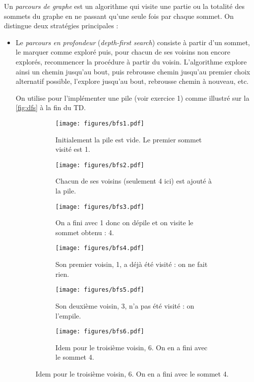 \documentclass{article}
\begin{document}
Un \emph{parcours de graphe} est un algorithme qui visite une partie ou la totalité des sommets du graphe en ne passant qu'une seule fois par chaque sommet. On distingue deux stratégies principales :
\begin{itemize}
	\item Le \emph{parcours en profondeur} (\textit{depth-first search}) consiste à partir d'un sommet, le marquer comme exploré puis, pour chacun de ses voisins non encore explorés, recommencer la procédure à partir du voisin. L'algorithme explore ainsi un chemin jusqu'au bout, puis rebrousse chemin jusqu'au premier choix alternatif possible, l'explore jusqu'au bout, rebrousse chemin à nouveau, etc.
	
	On utilise pour l'implémenter une pile (voir exercice 1) comme illustré sur la \autoref{fig:dfs} à la fin du TD.
	
	\begin{figure}[b]
		\caption{Illustration d'un parcours en profondeur commençant par le sommet 1}\label{fig:dfs}
		\begin{subfigure}[t]{0.3\linewidth}
			\centering
			\texttt{[image: figures/bfs1.pdf]}
			\caption{Initialement la pile est vide. Le premier sommet visité est 1.}
		\end{subfigure}\hfill%
		\begin{subfigure}[t]{0.3\linewidth}
			\centering
			\texttt{[image: figures/bfs2.pdf]}
			\caption{Chacun de ses voisins (seulement 4 ici) est ajouté à la pile.}
		\end{subfigure}\hfill%
		\begin{subfigure}[t]{0.3\linewidth}
			\centering
			\texttt{[image: figures/bfs3.pdf]}
			\caption{On a fini avec 1 donc on dépile et on visite le sommet obtenu : 4.}
		\end{subfigure}
		
		\begin{subfigure}[t]{0.3\linewidth}
			\centering
			\texttt{[image: figures/bfs4.pdf]}
			\caption{Son premier voisin, 1, a déjà été visité : on ne fait rien.}
		\end{subfigure}\hfill%
		\begin{subfigure}[t]{0.3\linewidth}
			\centering
			\texttt{[image: figures/bfs5.pdf]}
			\caption{Son deuxième voisin, 3, n'a pas été visité : on l'empile.}
		\end{subfigure}\hfill%
		\begin{subfigure}[t]{0.3\linewidth}
			\centering
			\texttt{[image: figures/bfs6.pdf]}
			\caption{Idem pour le troisième voisin, 6. On en a fini avec le sommet 4.}
		\end{subfigure}
		

\end{figure}
\end{itemize}
\end{document}
